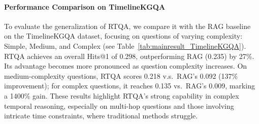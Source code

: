 \documentclass[11pt]{article}
\begin{document}
\paragraph{Performance Comparison on TimelineKGQA}  
To evaluate the generalization of RTQA, we compare it with the RAG baseline on the TimelineKGQA dataset, focusing on questions of varying complexity: Simple, Medium, and Complex (see Table~\ref{tab:mainresult_TimelineKGQA}).
RTQA achieves an overall Hits@1 of 0.298, outperforming RAG (0.235) by 27\%. Its advantage becomes more pronounced as question complexity increases. On medium-complexity questions, RTQA scores 0.218 v.s.\ RAG's 0.092 (137\% improvement); for complex questions, it reaches 0.135 vs.\ RAG's 0.009, marking a 1400\% gain. 
These results highlight RTQA’s strong capability in complex temporal reasoning, especially on multi-hop questions and those involving intricate time constraints, where traditional methods struggle.
\end{document}
